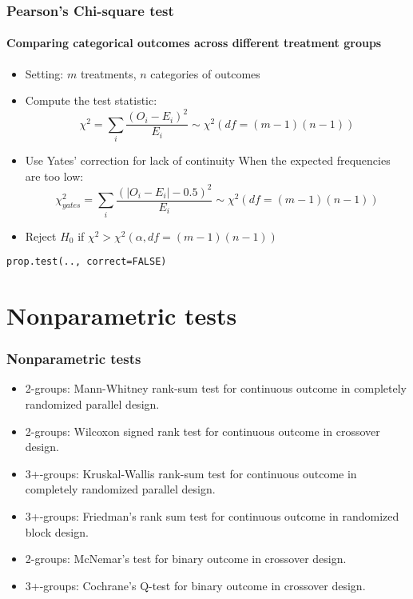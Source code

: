 \documentclass[table,10pt]{beamer}\usepackage[]{graphicx}\usepackage[]{color}
\begin{document}
\begin{CJK*}{UTF8}{gbsn}
\begin{frame}[t,containsverbatim]
\frametitle{Pearson's Chi-square test}
\framesubtitle{Comparing categorical outcomes across different treatment groups}
\begin{itemize}
	\item Setting: $m$ treatments, $n$ categories of outcomes
 	\item Compute the test statistic:
	$$
\chi^2 = \sum_{i} \frac{(O_i - E_i)^2}{E_i} \sim \chi^2(df=(m-1)(n-1))
	$$
	\item Use Yates' correction for lack of continuity When 
		the expected frequencies are too low:
	$$
\chi_{yates}^2 = \sum_{i} \frac{(|O_i - E_i|-0.5)^2}{E_i} \sim \chi^2 (df=(m-1)(n-1))
	$$
	\item Reject $H_0$ if $\chi^2 > \chi^2(\alpha, df=(m-1)(n-1))$
\end{itemize}
\begin{lstlisting}
prop.test(.., correct=FALSE)
\end{lstlisting}
\end{frame}


\section{Nonparametric tests}

\begin{frame}[t]
\frametitle{Nonparametric tests}
\begin{itemize}
	\item 2-groups: Mann-Whitney rank-sum test for continuous outcome in completely randomized 
		parallel design.
	\item 2-groups: Wilcoxon signed rank test for continuous outcome in crossover design.
	\item 3+-groups: Kruskal-Wallis rank-sum test for continuous outcome in completely 
		randomized parallel design. 
	\item 3+-groups: Friedman's rank sum test for continuous outcome in randomized 
		block design.
	\item 2-groups: McNemar's test for binary outcome in crossover design.
	\item 3+-groups: Cochrane's Q-test for binary outcome in crossover design.
\end{itemize}
\end{frame}



\end{CJK*}
\end{document}
